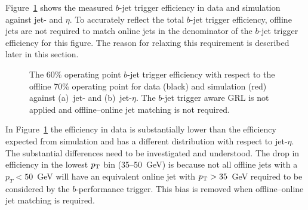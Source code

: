 Figure~\ref{fig:trig-Full_noGRL_eff_noHLTMatch} shows the measured $b$-jet trigger efficiency in data and simulation against jet-\pT{} and $\eta$.
To accurately reflect the total $b$-jet trigger efficiency, %
offline jets are not required to match online jets in the denominator of the $b$-jet trigger efficiency for this figure.
The reason for relaxing this requirement is described later in this section.

\begin{figure}[!htb]
  \begin{center}
    \captionsetup[subfigure]{aboveskip=0pt,justification=centering}
  \end{center}
  \vspace{-1em}
  \caption[The $b$-jet trigger efficiency in data and simulation
    when the $b$-jet trigger aware GRL is not applied and offline--online jet matching is not required.]
  {The 60\% operating point $b$-jet trigger efficiency with respect to the offline 70\% operating point
    for data (black) and simulation (red) against (a)~jet-\pT{} and (b)~jet-$\eta$.
    The $b$-jet trigger aware GRL is not applied and offline--online jet matching is not required.}
  \label{fig:trig-Full_noGRL_eff_noHLTMatch}
\end{figure}

In Figure~\ref{fig:trig-Full_noGRL_eff_noHLTMatch} the efficiency in data is substantially lower
than the efficiency expected from  simulation and has a different distribution with respect to jet-$\eta$.
The substantial differences need to be investigated and understood. 
The drop in efficiency in the lowest $p_{\mathrm{T}}$ bin (35--50~GeV) is because not all offline jets with a $p_T < 50$~GeV  will have an 
equivalent online jet with $p_{\mathrm{T}}{} > 35$~GeV required to be considered by the $b$-performance trigger. This bias is removed when offline--online jet matching is required.


